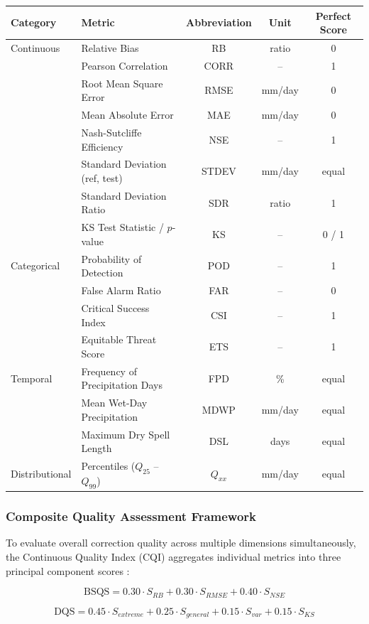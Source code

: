 \documentclass[11pt,a4paper]{article}
\begin{document}
\begingroup\small
\begin{longtable}[]{@{}llccc@{}}
\toprule
Category & Metric & Abbreviation & Unit & Perfect Score \\
\midrule
\endhead
\bottomrule
\endlastfoot
Continuous & Relative Bias & RB & ratio & 0 \\
& Pearson Correlation & CORR & -- & 1 \\
& Root Mean Square Error & RMSE & mm/day & 0 \\
& Mean Absolute Error & MAE & mm/day & 0 \\
& Nash-Sutcliffe Efficiency & NSE & -- & 1 \\
& Standard Deviation (ref, test) & STDEV & mm/day & equal \\
& Standard Deviation Ratio & SDR & ratio & 1 \\
& KS Test Statistic / \(p\)-value & KS & -- & 0 / 1 \\
Categorical & Probability of Detection & POD & -- & 1 \\
& False Alarm Ratio & FAR & -- & 0 \\
& Critical Success Index & CSI & -- & 1 \\
& Equitable Threat Score & ETS & -- & 1 \\
Temporal & Frequency of Precipitation Days & FPD & \% & equal \\
& Mean Wet-Day Precipitation & MDWP & mm/day & equal \\
& Maximum Dry Spell Length & DSL & days & equal \\
Distributional & Percentiles (\(Q_{25}\) -- \(Q_{99}\)) & \(Q_{xx}\) &
mm/day & equal \\
\end{longtable}
\endgroup

\subsubsection{Composite Quality Assessment Framework}\label{composite-quality-assessment-framework}

To evaluate overall correction quality across multiple dimensions simultaneously, the Continuous Quality Index (CQI) aggregates individual metrics into three principal component scores \cite{ref30}:

\begin{equation}\text{BSQS} = 0.30 \cdot S_{RB} + 0.30 \cdot S_{RMSE} + 0.40 \cdot S_{NSE}\end{equation}

\begin{equation}\text{DQS} = 0.45 \cdot S_{extreme} + 0.25 \cdot S_{general} + 0.15 \cdot S_{var} + 0.15 \cdot S_{KS}\end{equation}
\end{document}
